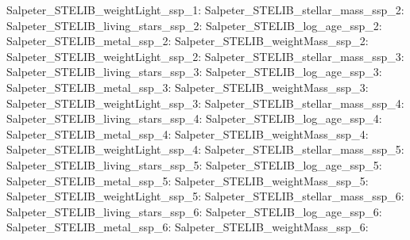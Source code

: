 Salpeter\_STELIB\_weightLight\_ssp\_1:  \newline 
Salpeter\_STELIB\_stellar\_mass\_ssp\_2:  \newline 
Salpeter\_STELIB\_living\_stars\_ssp\_2:  \newline 
Salpeter\_STELIB\_log\_age\_ssp\_2:  \newline 
Salpeter\_STELIB\_metal\_ssp\_2:  \newline 
Salpeter\_STELIB\_weightMass\_ssp\_2:  \newline 
Salpeter\_STELIB\_weightLight\_ssp\_2:  \newline 
Salpeter\_STELIB\_stellar\_mass\_ssp\_3:  \newline 
Salpeter\_STELIB\_living\_stars\_ssp\_3:  \newline 
Salpeter\_STELIB\_log\_age\_ssp\_3:  \newline 
Salpeter\_STELIB\_metal\_ssp\_3:  \newline 
Salpeter\_STELIB\_weightMass\_ssp\_3:  \newline 
Salpeter\_STELIB\_weightLight\_ssp\_3:  \newline 
Salpeter\_STELIB\_stellar\_mass\_ssp\_4:  \newline 
Salpeter\_STELIB\_living\_stars\_ssp\_4:  \newline 
Salpeter\_STELIB\_log\_age\_ssp\_4:  \newline 
Salpeter\_STELIB\_metal\_ssp\_4:  \newline 
Salpeter\_STELIB\_weightMass\_ssp\_4:  \newline 
Salpeter\_STELIB\_weightLight\_ssp\_4:  \newline 
Salpeter\_STELIB\_stellar\_mass\_ssp\_5:  \newline 
Salpeter\_STELIB\_living\_stars\_ssp\_5:  \newline 
Salpeter\_STELIB\_log\_age\_ssp\_5:  \newline 
Salpeter\_STELIB\_metal\_ssp\_5:  \newline 
Salpeter\_STELIB\_weightMass\_ssp\_5:  \newline 
Salpeter\_STELIB\_weightLight\_ssp\_5:  \newline 
Salpeter\_STELIB\_stellar\_mass\_ssp\_6:  \newline 
Salpeter\_STELIB\_living\_stars\_ssp\_6:  \newline 
Salpeter\_STELIB\_log\_age\_ssp\_6:  \newline 
Salpeter\_STELIB\_metal\_ssp\_6:  \newline 
Salpeter\_STELIB\_weightMass\_ssp\_6:  \newline 
